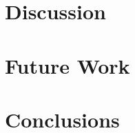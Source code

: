 \documentclass[12pt]{report}
\begin{document}
\chapter{Discussion}


\chapter{Future Work}


\chapter{Conclusions}








\appendix

\end{document}
